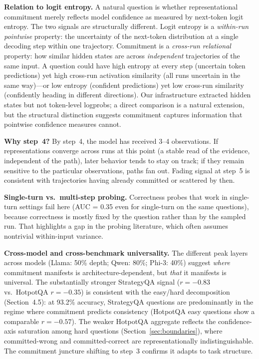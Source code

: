 \documentclass{article}
\begin{document}
\textbf{Relation to logit entropy.} A natural question is whether representational commitment merely reflects model confidence as measured by next-token logit entropy. The two signals are structurally different. Logit entropy is a \emph{within-run pointwise} property: the uncertainty of the next-token distribution at a single decoding step within one trajectory. Commitment is a \emph{cross-run relational} property: how similar hidden states are across \emph{independent} trajectories of the same input. A question could have high entropy at every step (uncertain token predictions) yet high cross-run activation similarity (all runs uncertain in the same way)---or low entropy (confident predictions) yet low cross-run similarity (confidently heading in different directions). Our infrastructure extracted hidden states but not token-level logprobs; a direct comparison is a natural extension, but the structural distinction suggests commitment captures information that pointwise confidence measures cannot.

\textbf{Why step~4?} By step~4, the model has received 3--4 observations. If representations converge across runs at this point (a stable read of the evidence, independent of the path), later behavior tends to stay on track; if they remain sensitive to the particular observations, paths fan out. Fading signal at step~5 is consistent with trajectories having already committed or scattered by then.

\textbf{Single-turn vs.\ multi-step probing.} Correctness probes that work in single-turn settings \citep{gnosis, stickland2024reasoning} fail here (AUC = 0.35 even for single-turn on the same questions), because correctness is mostly fixed by the question rather than by the sampled run. That highlights a gap in the probing literature, which often assumes nontrivial within-input variance.

\textbf{Cross-model and cross-benchmark universality.} The different peak layers across models (Llama: 50\% depth; Qwen: 80\%; Phi-3: 40\%) suggest \emph{where} commitment manifests is architecture-dependent, but \emph{that} it manifests is universal. The substantially stronger StrategyQA signal ($r = -0.83$ vs.\ HotpotQA $r = -0.35$) is consistent with the easy/hard decomposition (Section~4.5): at 93.2\% accuracy, StrategyQA questions are predominantly in the regime where commitment predicts consistency (HotpotQA easy questions show a comparable $r = -0.57$). The weaker HotpotQA aggregate reflects the confidence-axis saturation among hard questions (Section~\ref{sec:boundaries}), where committed-wrong and committed-correct are representationally indistinguishable. The commitment juncture shifting to step~3 confirms it adapts to task structure.
\end{document}
